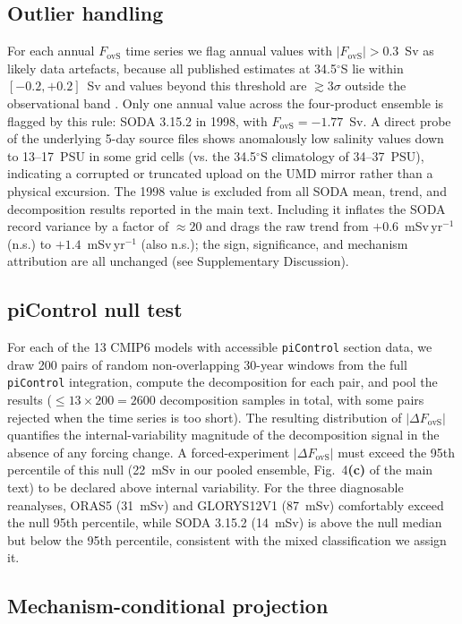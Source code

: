 \documentclass[11pt,a4paper]{article}
\newcommand{\Fovs}{F_\mathrm{ovS}}
\begin{document}
\subsection*{Outlier handling}

For each annual $\Fovs$ time series we flag annual values with $|\Fovs| > 0.3$~Sv as likely data artefacts, because all published estimates at 34.5$^\circ$S lie within $[-0.2, +0.2]$~Sv and values beyond this threshold are $\gtrsim3\sigma$ outside the observational band \citep{Weijer2019}. Only one annual value across the four-product ensemble is flagged by this rule: SODA 3.15.2 in 1998, with $\Fovs = -1.77$~Sv. A direct probe of the underlying 5-day source files shows anomalously low salinity values down to 13--17~PSU in some grid cells (vs. the 34.5$^\circ$S climatology of 34--37~PSU), indicating a corrupted or truncated upload on the UMD mirror rather than a physical excursion. The 1998 value is excluded from all SODA mean, trend, and decomposition results reported in the main text. Including it inflates the SODA record variance by a factor of $\approx20$ and drags the raw trend from $+0.6$~mSv\,yr$^{-1}$ (n.s.) to $+1.4$~mSv\,yr$^{-1}$ (also n.s.); the sign, significance, and mechanism attribution are all unchanged (see Supplementary Discussion).

\subsection*{piControl null test}

For each of the 13 CMIP6 models with accessible \texttt{piControl} section data, we draw 200 pairs of random non-overlapping 30-year windows from the full \texttt{piControl} integration, compute the decomposition for each pair, and pool the results ($\le 13\times200 = 2600$ decomposition samples in total, with some pairs rejected when the time series is too short). The resulting distribution of $|\Delta\Fovs|$ quantifies the internal-variability magnitude of the decomposition signal in the absence of any forcing change. A forced-experiment $|\Delta\Fovs|$ must exceed the 95th percentile of this null (22~mSv in our pooled ensemble, Fig.~4\textbf{(c)} of the main text) to be declared above internal variability. For the three diagnosable reanalyses, ORAS5 (31~mSv) and GLORYS12V1 (87~mSv) comfortably exceed the null 95th percentile, while SODA 3.15.2 (14~mSv) is above the null median but below the 95th percentile, consistent with the mixed classification we assign it.

\subsection*{Mechanism-conditional projection}
\end{document}
